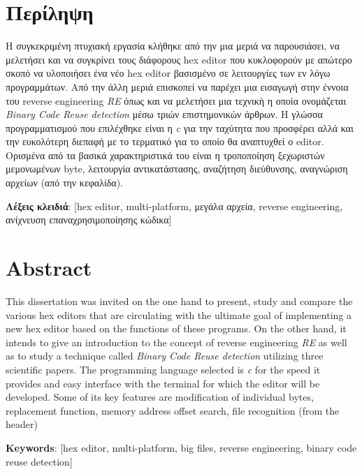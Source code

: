 \section*{Περίληψη}
Η συγκεκριμένη πτυχιακή εργασία κλήθηκε από την μια μεριά να παρουσιάσει, να μελετήσει και να συγκρίνει τους διάφορους hex editor που κυκλοφορούν με απώτερο σκοπό να υλοποιήσει ένα νέο hex editor βασισμένο σε λειτουργίες των εν λόγω προγραμμάτων.
Από την άλλη μεριά επισκοπεί να παρέχει μια εισαγωγή στην έννοια του reverse engineering \emph{RE} όπως και να μελετήσει μια τεχνική η οποία ονομάζεται \emph{Binary Code Reuse detection} μέσω τριών επιστημονικών άρθρων.
Η γλώσσα προγραμματισμού που επιλέχθηκε είναι η \emph{c} για την ταχύτητα που προσφέρει αλλά και την ευκολότερη διεπαφή με το τερματικό για το οποίο θα αναπτυχθεί ο editor.
Ορισμένα από τα βασικά χαρακτηριστικά του είναι η τροποποίηση ξεχωριστών μεμονωμένων byte, λειτουργία αντικατάστασης, αναζήτηση διεύθυνσης, αναγνώριση αρχείων (από την κεφαλίδα).


\vspace{1cm}
\noindent\textbf{Λέξεις κλειδιά}: [hex editor, multi-platform, μεγάλα αρχεία, reverse engineering, ανίχνευση επαναχρησιμοποίησης κώδικα]

\pagebreak
\section*{Abstract}
This dissertation was invited on the one hand to present, study and compare the various hex editors that are circulating with the ultimate goal of implementing a new hex editor based on the functions of these programs.
On the other hand, it intends to give an introduction to the concept of reverse engineering \emph{RE} as well as to study a technique called \emph{Binary Code Reuse detection} utilizing three scientific papers.
The programming language selected is \emph{c} for the speed it provides and easy interface with the terminal for which the editor will be developed.
Some of its key features are modification of individual bytes, replacement function, memory address offset search, file recognition (from the header)

\vspace{1cm}
\noindent\textbf{Keywords}: [hex editor, multi-platform, big files, reverse engineering, binary code reuse detection]
